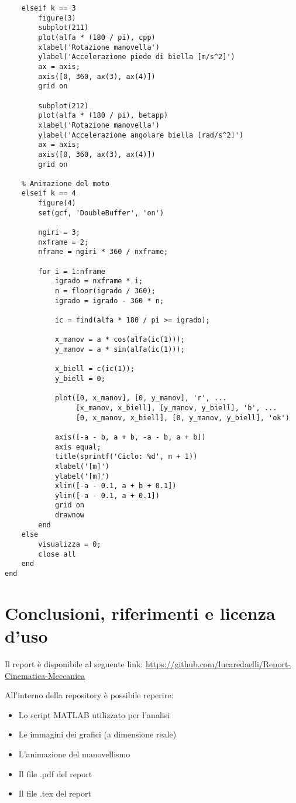\documentclass{article}
\begin{document}
\begin{lstlisting}[basicstyle=\footnotesize]
    % Grafico accelerazione
    elseif k == 3
        figure(3)
        subplot(211)
        plot(alfa * (180 / pi), cpp)
        xlabel('Rotazione manovella')
        ylabel('Accelerazione piede di biella [m/s^2]')
        ax = axis;
        axis([0, 360, ax(3), ax(4)])
        grid on

        subplot(212)
        plot(alfa * (180 / pi), betapp)
        xlabel('Rotazione manovella')
        ylabel('Accelerazione angolare biella [rad/s^2]')
        ax = axis;
        axis([0, 360, ax(3), ax(4)])
        grid on

    % Animazione del moto
    elseif k == 4
        figure(4)
        set(gcf, 'DoubleBuffer', 'on')

        ngiri = 3;
        nxframe = 2;
        nframe = ngiri * 360 / nxframe;
        
        for i = 1:nframe
            igrado = nxframe * i;
            n = floor(igrado / 360);
            igrado = igrado - 360 * n;

            ic = find(alfa * 180 / pi >= igrado);

            x_manov = a * cos(alfa(ic(1)));
            y_manov = a * sin(alfa(ic(1)));

            x_biell = c(ic(1));
            y_biell = 0;

            plot([0, x_manov], [0, y_manov], 'r', ...
                 [x_manov, x_biell], [y_manov, y_biell], 'b', ...
                 [0, x_manov, x_biell], [0, y_manov, y_biell], 'ok')
                 
            axis([-a - b, a + b, -a - b, a + b])
            axis equal;
            title(sprintf('Ciclo: %d', n + 1))
            xlabel('[m]')
            ylabel('[m]') 
            xlim([-a - 0.1, a + b + 0.1])
            ylim([-a - 0.1, a + 0.1])
            grid on
            drawnow
        end
    else
        visualizza = 0;
        close all
    end
end
\end{lstlisting}

\section{Conclusioni, riferimenti e licenza d'uso}
Il report è disponibile al seguente link: 
\hypersetup{urlcolor=blue}
\url{https://github.com/lucaredaelli/Report-Cinematica-Meccanica}

\bigskip
All'interno della repository è possibile reperire:

\begin{itemize}
    \item Lo script MATLAB utilizzato per l'analisi
    \item Le immagini dei grafici (a dimensione reale)
    \item L'animazione del manovellismo
    \item Il file .pdf del report
    \item Il file .tex del report
\end{itemize}
\end{document}
